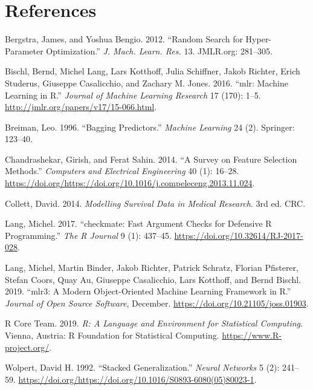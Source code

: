 \documentclass[]{scrbook}
\begin{document}
\hypertarget{references}{%
\chapter*{References}\label{references}}

\hypertarget{refs}{}
\leavevmode\hypertarget{ref-bergstra2012}{}%
Bergstra, James, and Yoshua Bengio. 2012. ``Random Search for Hyper-Parameter Optimization.'' \emph{J. Mach. Learn. Res.} 13. JMLR.org: 281--305.

\leavevmode\hypertarget{ref-mlr}{}%
Bischl, Bernd, Michel Lang, Lars Kotthoff, Julia Schiffner, Jakob Richter, Erich Studerus, Giuseppe Casalicchio, and Zachary M. Jones. 2016. ``mlr: Machine Learning in R.'' \emph{Journal of Machine Learning Research} 17 (170): 1--5. \url{http://jmlr.org/papers/v17/15-066.html}.

\leavevmode\hypertarget{ref-Breiman1996}{}%
Breiman, Leo. 1996. ``Bagging Predictors.'' \emph{Machine Learning} 24 (2). Springer: 123--40.

\leavevmode\hypertarget{ref-chandrashekar2014}{}%
Chandrashekar, Girish, and Ferat Sahin. 2014. ``A Survey on Feature Selection Methods.'' \emph{Computers and Electrical Engineering} 40 (1): 16--28. \url{https://doi.org/https://doi.org/10.1016/j.compeleceng.2013.11.024}.

\leavevmode\hypertarget{ref-Collett2014}{}%
Collett, David. 2014. \emph{Modelling Survival Data in Medical Research}. 3rd ed. CRC.

\leavevmode\hypertarget{ref-checkmate}{}%
Lang, Michel. 2017. ``checkmate: Fast Argument Checks for Defensive R Programming.'' \emph{The R Journal} 9 (1): 437--45. \url{https://doi.org/10.32614/RJ-2017-028}.

\leavevmode\hypertarget{ref-mlr3}{}%
Lang, Michel, Martin Binder, Jakob Richter, Patrick Schratz, Florian Pfisterer, Stefan Coors, Quay Au, Giuseppe Casalicchio, Lars Kotthoff, and Bernd Bischl. 2019. ``mlr3: A Modern Object-Oriented Machine Learning Framework in R.'' \emph{Journal of Open Source Software}, December. \url{https://doi.org/10.21105/joss.01903}.

\leavevmode\hypertarget{ref-R}{}%
R Core Team. 2019. \emph{R: A Language and Environment for Statistical Computing}. Vienna, Austria: R Foundation for Statistical Computing. \url{https://www.R-project.org/}.

\leavevmode\hypertarget{ref-Wolpert1992}{}%
Wolpert, David H. 1992. ``Stacked Generalization.'' \emph{Neural Networks} 5 (2): 241--59. \url{https://doi.org/https://doi.org/10.1016/S0893-6080(05)80023-1}.
\end{document}
